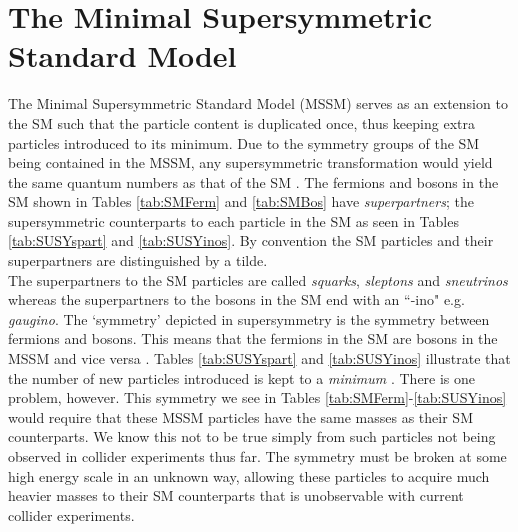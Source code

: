 \section{The Minimal Supersymmetric Standard Model}
The Minimal Supersymmetric Standard Model (MSSM) serves as an extension to the SM such that the particle content is duplicated once, thus keeping extra particles introduced to its minimum. Due to the symmetry groups of the SM being contained in the MSSM, any supersymmetric transformation would yield the same quantum numbers as that of the SM \cite{aitchison2007supersymmetry}. The fermions and bosons in the SM shown in Tables \ref{tab:SMFerm} and \ref{tab:SMBos}  have \textit{superpartners}; the supersymmetric counterparts to each particle in the SM as seen in Tables \ref{tab:SUSYspart} and \ref{tab:SUSYinos}. By convention the SM particles and their superpartners are distinguished by a tilde. \\

The superpartners to the SM particles are called \textit{squarks}, \textit{sleptons} and \textit{sneutrinos} whereas the superpartners to the bosons in the SM end with an ``-ino" e.g. \textit{gaugino}. The `symmetry' depicted in supersymmetry is the symmetry between fermions and bosons. This means that the fermions in the SM are bosons in the MSSM and vice versa \cite{martin1997supersymmetry}. Tables \ref{tab:SUSYspart} and \ref{tab:SUSYinos} illustrate that the number of new particles introduced is kept to a \textit{minimum} \cite{aitchison2007supersymmetry}. There is one problem, however. This symmetry we see in Tables \ref{tab:SMFerm}-\ref{tab:SUSYinos} would require that these MSSM particles have the same masses as their SM counterparts. We know this not to be true simply from such particles not being observed in collider experiments thus far. The symmetry must be broken at some high energy scale in an unknown way, allowing these particles to acquire much heavier masses to their SM counterparts that is unobservable with current collider experiments. \\

